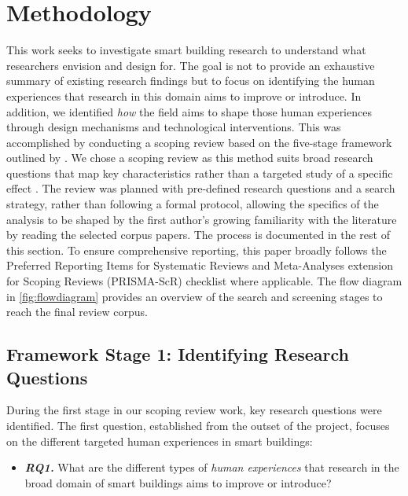 \section{Methodology}
\label{sec-ch2:methodology}
This work seeks to investigate smart building research to understand what researchers envision and design for. The goal is not to provide an exhaustive summary of existing research findings but to focus on identifying the human experiences that research in this domain aims to improve or introduce. In addition, we identified \emph{how} the field aims to shape those human experiences through design mechanisms and technological interventions. This was accomplished by conducting a scoping review based on the five-stage framework outlined by \citet{arksey2005scoping}. We chose a scoping review as this method suits broad research questions that map key characteristics rather than a targeted study of a specific effect \cite{munn2018systematic, rogers2024umbrella}. The review was planned with pre-defined research questions and a search strategy, rather than following a formal protocol, allowing the specifics of the analysis to be shaped by the first author's growing familiarity with the literature by reading the selected corpus papers. The process is documented in the rest of this section. 
To ensure comprehensive reporting, this paper broadly follows the Preferred Reporting Items for Systematic Reviews and Meta-Analyses extension for Scoping Reviews (PRISMA-ScR) checklist where applicable. The flow diagram in \autoref{fig:flowdiagram} provides an overview of the search and screening stages to reach the final review corpus. 




\subsection{Framework Stage 1: Identifying Research Questions}
During the first stage in our scoping review work, key research questions were identified. The first question, established from the outset of the project, focuses on the different targeted human experiences in smart buildings:

\begin{itemize}
    \item \textbf{\textit{RQ1.}} What are the different types of \emph{human experiences} that research in the broad domain of smart buildings aims to improve or introduce?
\end{itemize}

